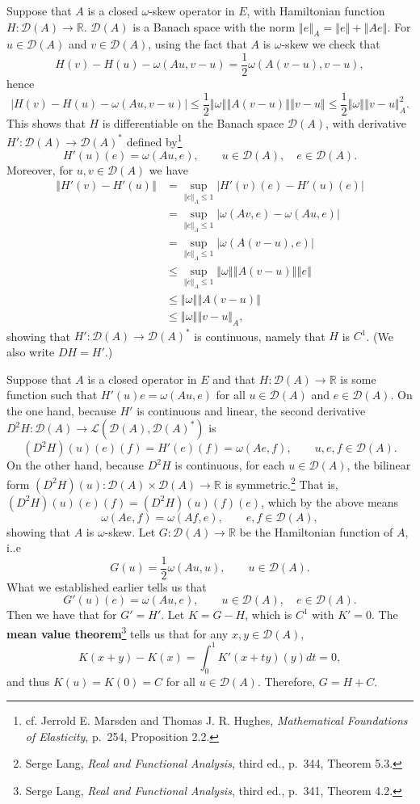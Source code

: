 \documentclass{article}
\newcommand{\norm}[1]{\left\Vert #1 \right\Vert}
\theoremstyle{definition}
\begin{document}
Suppose that $A$ is a closed $\omega$-skew operator in $E$, with Hamiltonian function
$H:\mathscr{D}(A) \to \mathbb{R}$. $\mathscr{D}(A)$ is a Banach space with the norm
$\norm{e}_A = \norm{e}+\norm{Ae}$.
For $u \in \mathscr{D}(A)$
and $v \in \mathscr{D}(A)$, using the fact that $A$ is $\omega$-skew we check that
\[
H(v)-H(u)-\omega(Au,v-u) = \frac{1}{2}\omega(A(v-u),v-u),
\]
hence
\[
|H(v)-H(u) - \omega(Au,v-u)| \leq \frac{1}{2}\norm{\omega} \norm{A(v-u)} \norm{v-u}
\leq \frac{1}{2}\norm{\omega} \norm{v-u}_A^2.
\]
This shows that $H$ is differentiable on the Banach space $\mathscr{D}(A)$, with derivative
$H':\mathscr{D}(A) \to \mathscr{D}(A)^*$ defined by\footnote{cf.
Jerrold E. Marsden and Thomas J. R. Hughes, {\em Mathematical Foundations of Elasticity}, p.~254, Proposition 2.2.}
\[
H'(u)(e) = \omega(Au,e), \qquad u \in \mathscr{D}(A), \quad e \in \mathscr{D}(A).
\]
Moreover, for $u, v \in \mathscr{D}(A)$ we have
\begin{align*}
\norm{H'(v)-H'(u)} &= \sup_{\norm{e}_A \leq 1}
|H'(v)(e)-H'(u)(e)|\\
&= \sup_{\norm{e}_A \leq 1} |\omega(Av,e)-\omega(Au,e)|\\
&= \sup_{\norm{e}_A \leq 1} |\omega(A(v-u),e)|\\
&\leq \sup_{\norm{e}_A \leq 1} \norm{\omega} \norm{A(v-u)} \norm{e}\\
&\leq \norm{\omega} \norm{A(v-u)}\\
&\leq \norm{\omega} \norm{v-u}_A,
\end{align*}
showing that $H':\mathscr{D}(A) \to \mathscr{D}(A)^*$ is continuous, namely
that $H$ is $C^1$.
(We also write $DH=H'$.)

Suppose that $A$ is a closed  operator in $E$ and that $H:\mathscr{D}(A) \to \mathbb{R}$ is some function
such that
$H'(u)e=\omega(Au,e)$ for all $u \in \mathscr{D}(A)$ and $e \in \mathscr{D}(A)$.
On the one hand, because $H'$ is continuous and linear, the second derivative $D^2 H:\mathscr{D}(A) \to \mathscr{L}(\mathscr{D}(A),\mathscr{D}(A)^*)$  is
\[
(D^2H)(u)(e)(f) = H'(e)(f) =\omega(Ae,f), \qquad u, e, f \in \mathscr{D}(A).
\]
On the other hand, because $D^2 H$ is continuous, for each $u \in \mathscr{D}(A)$, the bilinear form $(D^2H)(u):\mathscr{D}(A) \times
\mathscr{D}(A) \to \mathbb{R}$ is symmetric.\footnote{Serge Lang, {\em Real and Functional Analysis}, third ed., p.~344, Theorem 5.3.}
That is, $(D^2H)(u)(e)(f)=(D^2H)(u)(f)(e)$, which by the above means
\[
\omega(Ae,f)=\omega(Af,e), \qquad e,f \in \mathscr{D}(A),
\]
showing that $A$ is $\omega$-skew. Let $G:\mathscr{D}(A) \to \mathbb{R}$ be the Hamiltonian function of $A$, i..e
\[
G(u) = \frac{1}{2}\omega(Au,u), \qquad u \in \mathscr{D}(A).
\]
What we established earlier tells us that
\[
G'(u)(e)=\omega(Au,e), \qquad u \in \mathscr{D}(A), \quad e \in \mathscr{D}(A).
\]
Then we have that for $G'=H'$. Let $K=G-H$, which is $C^1$ with  $K'=0$. The
\textbf{mean value theorem}\footnote{Serge Lang, {\em Real and Functional Analysis}, third ed., p.~341, Theorem 4.2.} tells us that
for any $x,y \in \mathscr{D}(A)$,
\[
K(x+y)-K(x) = \int_0^1 K'(x+ty)(y) dt = 0,
\]
and thus $K(u)=K(0)=C$ for all $u \in \mathscr{D}(A)$. Therefore, 
$G=H+C$. 
\end{document}
